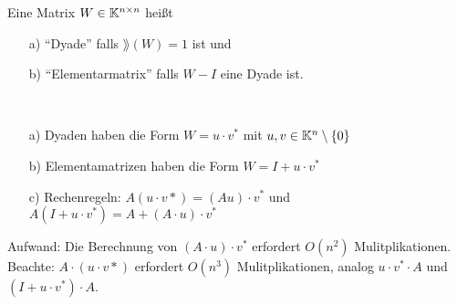\begin{Definition}
Eine Matrix $W \in \mathbb K^{n \times n}$ heißt
\begin{enumerate}
  \item[a)] "`Dyade"' falls $\rang(W) = 1$ ist und
  \item[b)] "`Elementarmatrix"' falls $W - I$ eine Dyade ist.
\end{enumerate}
\end{Definition}
\begin{Bemerkungen}
\quad \\
  \begin{enumerate}
    \item[a)] Dyaden haben die Form $W = u \cdot v^*$ mit $u, v \in \mathbb K^n\setminus \lbrace 0 \rbrace$
    \item[b)] Elementamatrizen haben die Form $W = I + u \cdot v^*$
    \item[c)] Rechenregeln: $A(u \cdot v*) = (A u) \cdot v^*$ und
      $A (I + u \cdot v^*) = A + (A \cdot u) \cdot v^*$
  \end{enumerate}
Aufwand: Die Berechnung von $(A \cdot u) \cdot v^*$ erfordert $O(n^2)$ Mulitplikationen.
Beachte: $A\cdot (u \cdot v*)$ erfordert $O(n^3)$ Mulitplikationen, analog
$u \cdot v^* \cdot A$ und $ (I + u \cdot v^*) \cdot A$.
\end{Bemerkungen}


